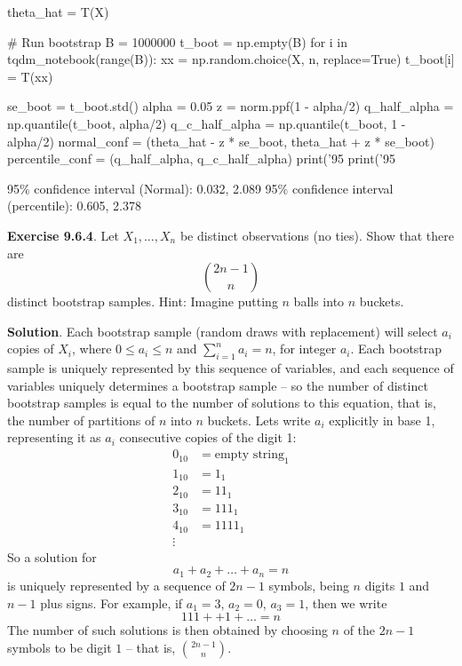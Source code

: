 \begin{python}
theta_hat = T(X)
\end{python}

\begin{python}
# Run bootstrap
B = 1000000
t_boot = np.empty(B)
for i in tqdm_notebook(range(B)):
    xx = np.random.choice(X, n, replace=True)
    t_boot[i] = T(xx)
    
se_boot = t_boot.std()
alpha = 0.05
z = norm.ppf(1 - alpha/2)
q_half_alpha = np.quantile(t_boot, alpha/2)
q_c_half_alpha = np.quantile(t_boot, 1 - alpha/2)
normal_conf = (theta_hat - z * se_boot, theta_hat + z * se_boot)
percentile_conf = (q_half_alpha, q_c_half_alpha)
print('95%
print('95%
\end{python}
\begin{console}
95\% confidence interval (Normal):        0.032, 2.089
95\% confidence interval (percentile):    0.605, 2.378
\end{console}

\textbf{Exercise 9.6.4}. Let \(X_{1}, \dots, X_{n}\) be distinct
observations (no ties). Show that there are
\[
\binom{2n - 1}{n}
\]
distinct bootstrap samples.
Hint: Imagine putting \(n\) balls into \(n\) buckets.

\textbf{Solution}.
Each bootstrap sample (random draws with replacement) will select
\(a_{i}\) copies of \(X_{i}\), where \(0 \leq a_{i} \leq n\) and
\(\sum_{i=1}^{n} a_{i} = n\), for integer \(a_{i}\). Each bootstrap sample is
uniquely represented by this sequence of variables, and each sequence of
variables uniquely determines a bootstrap sample -- so the number of
distinct bootstrap samples is equal to the number of solutions to this
equation, that is, the number of partitions of \(n\) into \(n\) buckets.
Lets write \(a_{i}\) explicitly in base 1, representing it as \(a_{i}\)
consecutive copies of the digit 1:
\begin{align*}
0_{10} & = \text{empty string}_{1} \\
1_{10} & = 1_{1} \\
2_{10} & = 11_{1} \\
3_{10} & = 111_{1} \\
4_{10} & = 1111_{1} \\
\vdots
\end{align*}
So a solution for
\[
a_{1} + a_{2} + \dots + a_{n} = n
\]
is uniquely represented by a sequence of \(2n - 1\) symbols, being \(n\)
digits \(1\) and \(n - 1\) plus signs. For example, if \(a_{1} = 3\),
\(a_{2} = 0\), \(a_{3} = 1\), then we write
\[
111 + + 1 + \dots = n
\]
The number of such solutions is then obtained by choosing \(n\) of the
\(2n - 1\) symbols to be digit \(1\) -- that is, \(\binom{2n - 1}{n}\).

